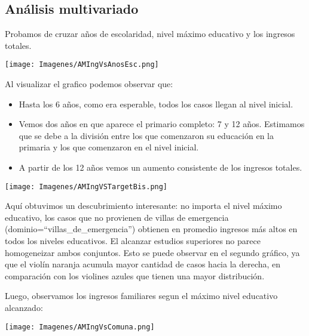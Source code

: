 \documentclass[a4paper]{article}
\begin{document}
    \newpage
    
    \subsection{Análisis multivariado}
 
        Probamos de cruzar años de escolaridad, nivel máximo educativo y los ingresos totales.
 
        \begin{center}
            \texttt{[image: Imagenes/AMIngVsAnosEsc.png]}
        \end{center}
 
        Al visualizar el grafico podemos observar que:
 
        \begin{itemize}
            \item Hasta los 6 años, como era esperable, todos los casos llegan al nivel inicial.
            \item Vemos dos años en que aparece el primario completo: 7 y 12 años. Estimamos que se debe a la división entre los que comenzaron su educación en la primaria y los que comenzaron en el nivel inicial.
            \item A partir de los 12 años vemos un aumento consistente de los ingresos totales.
        \end{itemize}
 
        \begin{center}
            \texttt{[image: Imagenes/AMIngVSTargetBis.png]}
        \end{center}
 
        Aquí obtuvimos un descubrimiento interesante: no importa el nivel máximo educativo, los casos que no provienen de villas de emergencia (dominio=``villas\_de\_emergencia'') obtienen en promedio ingresos más altos en todos los niveles educativos. El alcanzar estudios superiores no parece homogeneizar ambos conjuntos. Esto se puede observar en el segundo gráfico, ya que el violín naranja acumula mayor cantidad de casos hacia la derecha, en comparación con los violines azules que tienen una mayor distribución.
        
        \newpage

        Luego, observamos los ingresos familiares segun el máximo nivel educativo alcanzado:
        \begin{center}
            \texttt{[image: Imagenes/AMIngVsComuna.png]}
        \end{center}
 
\end{document}
